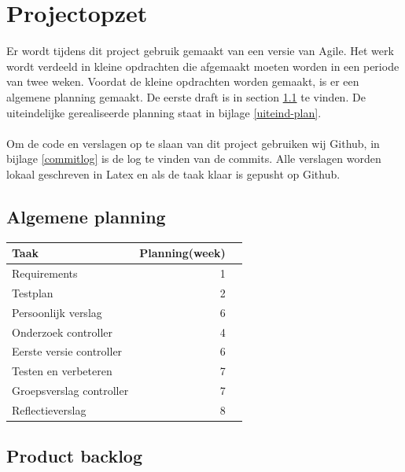 \documentclass{article}
\begin{document}
\section{Projectopzet}
Er wordt tijdens dit project gebruik gemaakt van een versie van Agile. Het werk wordt verdeeld in kleine opdrachten die afgemaakt moeten worden in een periode van twee weken. Voordat de kleine opdrachten worden gemaakt, is er een algemene planning gemaakt. De eerste draft is in section \ref{eerste-draft} te vinden. De uiteindelijke gerealiseerde planning staat in bijlage \ref{uiteind-plan}.\\\\
Om de code en verslagen op te slaan van dit project gebruiken wij Github, in bijlage \ref{commitlog} is de log te vinden van de commits. Alle verslagen worden lokaal geschreven in Latex en als de taak klaar is gepusht op Github.

\subsection{Algemene planning}
\label{eerste-draft}
\begin{table}[h!]
\begin{tabularx}{\textwidth}{l r r}
 \textbf{Taak} & \textbf{Planning(week)}  \\ \hline
 Requirements & 1 \\
 Testplan & 2  \\
 Persoonlijk verslag & 6 \\
 Onderzoek controller & 4 \\
 Eerste versie controller & 6  \\
 Testen en verbeteren & 7  \\
 Groepsverslag controller & 7  \\
 Reflectieverslag & 8  \\
\end{tabularx}
\end{table}

\newpage

\subsection*{Product backlog}
\end{document}
